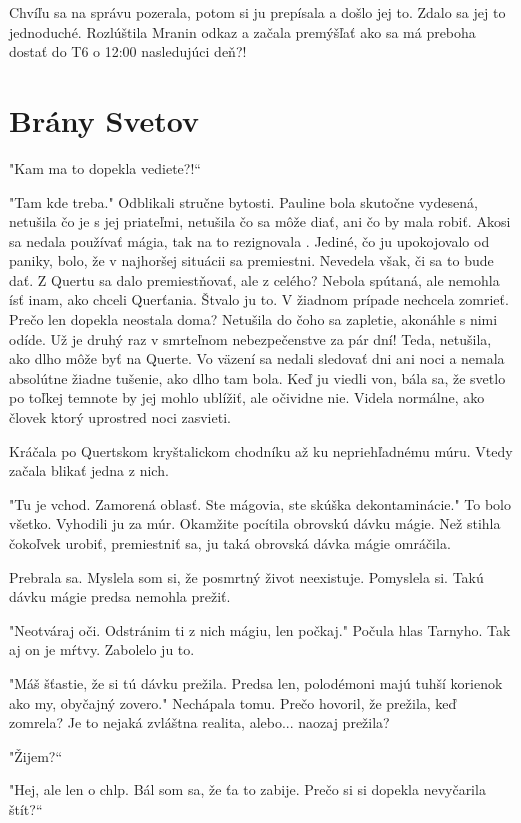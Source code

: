 \documentclass{book}
\begin{document}
Chvíľu sa na správu pozerala, potom si ju prepísala a došlo jej to. Zdalo sa jej to jednoduché. Rozlúštila Mranin odkaz a začala premýšľať ako sa má preboha dostať do T6 o 12:00 nasledujúci deň?!

\chapter{Brány Svetov}

"$ $Kam ma to dopekla vediete?!“

"$ $Tam kde treba."$ $ Odblikali stručne bytosti. Pauline bola skutočne vydesená, netušila čo je s jej priateľmi, netušila čo sa môže diať, ani čo by mala robiť. Akosi sa nedala používať mágia, tak na to rezignovala . Jediné, čo ju upokojovalo od paniky, bolo, že v najhoršej situácii sa premiestni. Nevedela však, či sa to bude dať. Z Quertu sa dalo premiestňovať, ale z celého? Nebola spútaná, ale nemohla ísť inam, ako chceli Querťania. Štvalo ju to. V žiadnom prípade nechcela zomrieť. Prečo len dopekla neostala doma? Netušila do čoho sa zapletie, akonáhle s nimi odíde. Už je druhý raz v smrteľnom nebezpečenstve za pár dní! Teda, netušila, ako dlho môže byť na Querte. Vo väzení sa nedali sledovať dni ani noci a nemala absolútne žiadne tušenie, ako dlho tam bola. Keď ju viedli von, bála sa, že svetlo po toľkej temnote by jej mohlo ublížiť, ale očividne nie. Videla normálne, ako človek ktorý uprostred noci zasvieti.

Kráčala po Quertskom kryštalickom chodníku až ku nepriehľadnému múru. Vtedy začala blikať jedna z nich.

"$ $Tu je vchod. Zamorená oblasť. Ste mágovia, ste skúška dekontaminácie."$ $ To bolo všetko. Vyhodili ju za múr. Okamžite pocítila obrovskú dávku mágie. Než stihla čokoľvek urobiť, premiestniť sa, ju taká obrovská dávka mágie omráčila.

Prebrala sa. Myslela som si, že posmrtný život neexistuje. Pomyslela si. Takú dávku mágie predsa nemohla prežiť.

"$ $Neotváraj oči. Odstránim ti z nich mágiu, len počkaj."$ $ Počula hlas Tarnyho. Tak aj on je mŕtvy. Zabolelo ju to.

"$ $Máš šťastie, že si tú dávku prežila. Predsa len, polodémoni majú tuhší korienok ako my, obyčajný zovero."$ $ Nechápala tomu. Prečo hovoril, že prežila, keď zomrela? Je to nejaká zvláštna realita, alebo... naozaj prežila?

"$ $Žijem?“

"$ $Hej, ale len o chlp. Bál som sa, že ťa to zabije. Prečo si si dopekla nevyčarila štít?“
\end{document}
